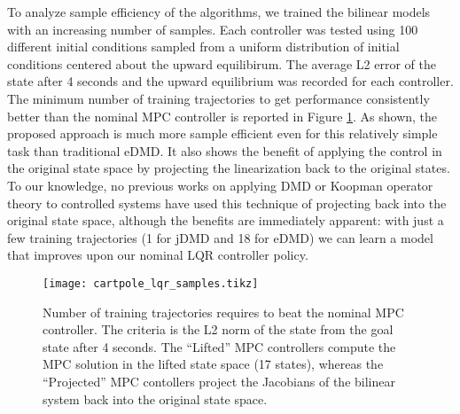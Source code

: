 \documentclass{article}
\begin{document}
To analyze sample efficiency of the algorithms, we trained the bilinear models with an 
increasing number of samples. Each controller was tested using 100 different initial
conditions sampled from a uniform distribution of initial conditions centered about the 
upward equilibirum. The average L2 error of the state after 4 seconds and the upward 
equilibrium was recorded for each controller. The minimum number of training trajectories to
get performance consistently better than the nominal MPC controller is reported in Figure 
\ref{fig:cartpole_lqr_samples}. As shown, the proposed approach is much more sample
efficient even for this relatively simple task than traditional eDMD. It also shows the
benefit of applying the control in the original state space by projecting the linearization
back to the original states. To our knowledge, no previous works on applying DMD or Koopman
operator theory to controlled systems have used this technique of projecting back into the
original state space, although the benefits are immediately apparent: with just a few
training trajectories (1 for jDMD and 18 for eDMD) we can learn a model that improves upon
our nominal LQR controller policy.

\begin{figure}
  \centering
  \texttt{[image: cartpole\_lqr\_samples.tikz]}
  \caption{Number of training trajectories requires to beat the nominal MPC controller.
    The criteria is the L2 norm of the state from the goal state after 4 seconds.
    The ``Lifted'' MPC controllers compute the MPC solution in the lifted state space 
    (17 states), whereas the ``Projected'' MPC contollers project the Jacobians of the 
    bilinear system back into the original state space.
  }
  \label{fig:cartpole_lqr_samples}
\end{figure}
\end{document}
